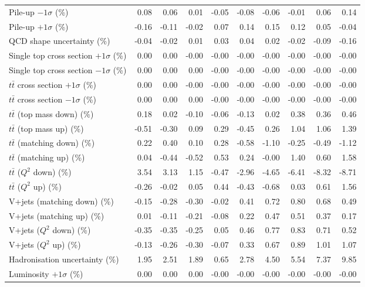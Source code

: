 \begin{table}[htbp]
{\begin{tabular}{lrrrrrrrrr}
Pile-up $-1\sigma$ (\%) & 0.08 & 0.06 & 0.01 & -0.05 & -0.08 & -0.06 & -0.01 & 0.06 & 0.14 \\ 
Pile-up $+1\sigma$ (\%) & -0.16 & -0.11 & -0.02 & 0.07 & 0.14 & 0.15 & 0.12 & 0.05 & -0.04 \\ 
QCD shape uncertainty (\%) & -0.04 & -0.02 & 0.01 & 0.03 & 0.04 & 0.02 & -0.02 & -0.09 & -0.16 \\ 
Single top cross section $+1\sigma$ (\%) & 0.00 & 0.00 & -0.00 & -0.00 & -0.00 & -0.00 & -0.00 & -0.00 & -0.00 \\ 
Single top cross section $-1\sigma$ (\%) & 0.00 & 0.00 & 0.00 & -0.00 & -0.00 & -0.00 & -0.00 & -0.00 & -0.00 \\ 
$t\bar{t}$ cross section $+1\sigma$ (\%) & 0.00 & 0.00 & -0.00 & -0.00 & -0.00 & -0.00 & -0.00 & -0.00 & -0.00 \\ 
$t\bar{t}$ cross section $-1\sigma$ (\%) & 0.00 & 0.00 & 0.00 & -0.00 & -0.00 & -0.00 & -0.00 & -0.00 & -0.00 \\ 
$t\bar{t}$ (top mass down) (\%) & 0.18 & 0.02 & -0.10 & -0.06 & -0.13 & 0.02 & 0.38 & 0.36 & 0.46 \\ 
$t\bar{t}$ (top mass up) (\%) & -0.51 & -0.30 & 0.09 & 0.29 & -0.45 & 0.26 & 1.04 & 1.06 & 1.39 \\ 
$t\bar{t}$ (matching down) (\%) & 0.22 & 0.40 & 0.10 & 0.28 & -0.58 & -1.10 & -0.25 & -0.49 & -1.12 \\ 
$t\bar{t}$ (matching up) (\%) & 0.04 & -0.44 & -0.52 & 0.53 & 0.24 & -0.00 & 1.40 & 0.60 & 1.58 \\ 
$t\bar{t}$ ($Q^{2}$ down) (\%) & 3.54 & 3.13 & 1.15 & -0.47 & -2.96 & -4.65 & -6.41 & -8.32 & -8.71 \\ 
$t\bar{t}$ ($Q^{2}$ up) (\%) & -0.26 & -0.02 & 0.05 & 0.44 & -0.43 & -0.68 & 0.03 & 0.61 & 1.56 \\ 
V+jets (matching down) (\%) & -0.15 & -0.28 & -0.30 & -0.02 & 0.41 & 0.72 & 0.80 & 0.68 & 0.49 \\ 
V+jets (matching up) (\%) & 0.01 & -0.11 & -0.21 & -0.08 & 0.22 & 0.47 & 0.51 & 0.37 & 0.17 \\ 
V+jets ($Q^{2}$ down) (\%) & -0.35 & -0.35 & -0.25 & 0.05 & 0.46 & 0.77 & 0.83 & 0.71 & 0.52 \\ 
V+jets ($Q^{2}$ up) (\%) & -0.13 & -0.26 & -0.30 & -0.07 & 0.33 & 0.67 & 0.89 & 1.01 & 1.07 \\ 
Hadronisation uncertainty (\%) & 1.95 & 2.51 & 1.89 & 0.65 & 2.78 & 4.50 & 5.54 & 7.37 & 9.85 \\ 
Luminosity $+1\sigma$ (\%) & 0.00 & 0.00 & 0.00 & -0.00 & -0.00 & -0.00 & -0.00 & -0.00 & -0.00 \\ 

\end{tabular}}
\end{table}
